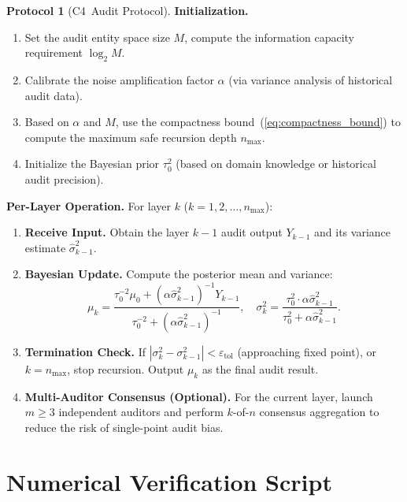 \documentclass[12pt,a4paper]{article}
\theoremstyle{definition}
\newtheorem{protocol}[theorem]{Protocol}
\newcommand{\Cfour}{\textsc{C4}}
\begin{document}
\begin{protocol}[\Cfour\ Audit Protocol]\label{prot:c4_audit}
\textbf{Initialization.}
\begin{enumerate}[leftmargin=*, label=\textbf{I\arabic*}]
    \item Set the audit entity space size $M$, compute the information capacity requirement $\log_2 M$.
    \item Calibrate the noise amplification factor $\alpha$ (via variance analysis of historical audit data).
    \item Based on $\alpha$ and $M$, use the compactness bound~(\ref{eq:compactness_bound}) to compute the maximum safe recursion depth $n_{\max}$.
    \item Initialize the Bayesian prior $\tau_0^2$ (based on domain knowledge or historical audit precision).
\end{enumerate}

\noindent
\textbf{Per-Layer Operation.} For layer $k$ ($k = 1, 2, \ldots, n_{\max}$):
\begin{enumerate}[leftmargin=*, label=\textbf{L\arabic*}]
    \item \textbf{Receive Input.} Obtain the layer $k-1$ audit output $Y_{k-1}$ and its variance estimate $\hat{\sigma}_{k-1}^2$.
    \item \textbf{Bayesian Update.} Compute the posterior mean and variance:
    \begin{equation*}
        \mu_k = \frac{\tau_0^{-2} \mu_0 + (\alpha \hat{\sigma}_{k-1}^2)^{-1} Y_{k-1}}{\tau_0^{-2} + (\alpha \hat{\sigma}_{k-1}^2)^{-1}}, \quad
        \sigma_k^2 = \frac{\tau_0^2 \cdot \alpha \hat{\sigma}_{k-1}^2}{\tau_0^2 + \alpha \hat{\sigma}_{k-1}^2}.
    \end{equation*}
    \item \textbf{Termination Check.} If $|\sigma_k^2 - \sigma_{k-1}^2| < \varepsilon_{\text{tol}}$ (approaching fixed point), or $k = n_{\max}$, stop recursion. Output $\mu_k$ as the final audit result.
    \item \textbf{Multi-Auditor Consensus (Optional).} For the current layer, launch $m \geq 3$ independent auditors and perform $k$-of-$n$ consensus aggregation to reduce the risk of single-point audit bias.
\end{enumerate}
\end{protocol}

\section{Numerical Verification Script}
\end{document}
